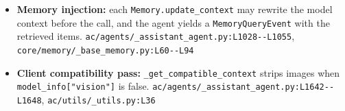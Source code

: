 \begin{itemize}
\item \textbf{Memory injection:} each \texttt{Memory.\allowbreak{}update\_\allowbreak{}context} may rewrite the model context before the call, and the agent yields a \texttt{MemoryQueryEvent} with the retrieved items. \texttt{ac/\allowbreak{}agents/\allowbreak{}\_\allowbreak{}assistant\_\allowbreak{}agent.\allowbreak{}py:\allowbreak{}L1028-\allowbreak{}-\allowbreak{}L1055}, \texttt{core/\allowbreak{}memory/\allowbreak{}\_\allowbreak{}base\_\allowbreak{}memory.\allowbreak{}py:\allowbreak{}L60-\allowbreak{}-\allowbreak{}L94}
\item \textbf{Client compatibility pass:} \texttt{\_\allowbreak{}get\_\allowbreak{}compatible\_\allowbreak{}context} strips images when \texttt{model\_\allowbreak{}info["vision"]} is false. \texttt{ac/\allowbreak{}agents/\allowbreak{}\_\allowbreak{}assistant\_\allowbreak{}agent.\allowbreak{}py:\allowbreak{}L1642-\allowbreak{}-\allowbreak{}L1648}, \texttt{ac/\allowbreak{}utils/\allowbreak{}\_\allowbreak{}utils.\allowbreak{}py:\allowbreak{}L36}
\end{itemize}

